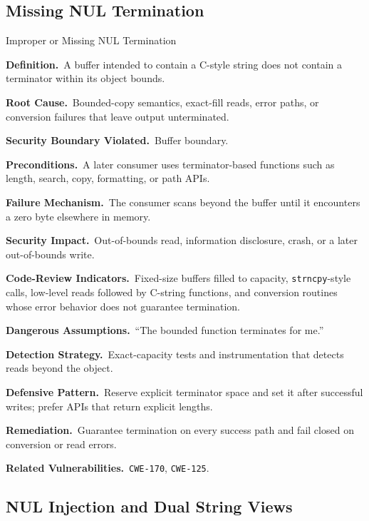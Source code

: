 \documentclass[11pt]{article}
\newcommand{\field}[1]{\par\smallskip\noindent\textbf{#1.}\ }
\newcommand{\cwe}[1]{\texttt{#1}}
\begin{document}
\subsection{Missing NUL Termination}

\begin{catalogbox}{Improper or Missing NUL Termination}
\field{Definition}A buffer intended to contain a C-style string does not contain a terminator within its object bounds.

\field{Root Cause}Bounded-copy semantics, exact-fill reads, error paths, or conversion failures that leave output unterminated.

\field{Security Boundary Violated}Buffer boundary.

\field{Preconditions}A later consumer uses terminator-based functions such as length, search, copy, formatting, or path APIs.

\field{Failure Mechanism}The consumer scans beyond the buffer until it encounters a zero byte elsewhere in memory.

\field{Security Impact}Out-of-bounds read, information disclosure, crash, or a later out-of-bounds write.

\field{Code-Review Indicators}Fixed-size buffers filled to capacity, \texttt{strncpy}-style calls, low-level reads followed by C-string functions, and conversion routines whose error behavior does not guarantee termination.

\field{Dangerous Assumptions}``The bounded function terminates for me.''

\field{Detection Strategy}Exact-capacity tests and instrumentation that detects reads beyond the object.

\field{Defensive Pattern}Reserve explicit terminator space and set it after successful writes; prefer APIs that return explicit lengths.

\field{Remediation}Guarantee termination on every success path and fail closed on conversion or read errors.

\field{Related Vulnerabilities}\cwe{CWE-170}, \cwe{CWE-125}.
\end{catalogbox}
\clearpage

\subsection{NUL Injection and Dual String Views}
\end{document}
